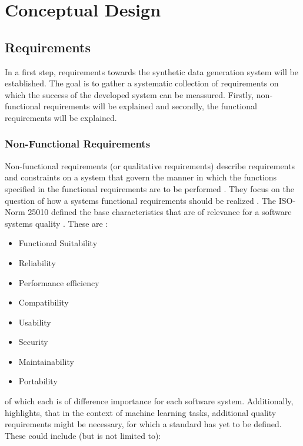 \chapter{Conceptual Design}
\label{ch:conceptualDesign}

\section{Requirements}
\label{ch:conceptualDesign-requirements}

In a first step, requirements towards the synthetic data generation system will be established.
The goal is to gather a systematic collection of requirements on which the success of the developed system can be meassured.
Firstly, non-functional requirements will be explained and secondly, the functional requirements will be explained.


\subsection*{Non-Functional Requirements}

Non-functional requirements (or qualitative requirements) describe requirements and constraints on a system that govern the manner in which the functions specified in the functional requirements are to be performed \cite{broy2021EinfuehrungSoftwaretechnik}.
They focus on the question of how a systems functional requirements should be realized \cite{broy2021EinfuehrungSoftwaretechnik}.
The ISO-Norm 25010 \cite{SystemsSoftwareEngineering} defined the base characteristics that are of relevance for a software systems quality \cite{haoues2017GuidelineSoftwareArchitecture}.
These are \cite{haoues2017GuidelineSoftwareArchitecture}:
\begin{itemize}
    \item Functional Suitability
    \item Reliability
    \item Performance efficiency
    \item Compatibility
    \item Usability
    \item Security
    \item Maintainability
    \item Portability
\end{itemize}

of which each is of difference importance for each software system.
Additionally, \cite{vogelsang2019RequirementsEngineeringMachine} highlights, that in the context of machine learning tasks, additional quality requirements might be necessary, for which a standard has yet to be defined.
These could include (but is not limited to):


